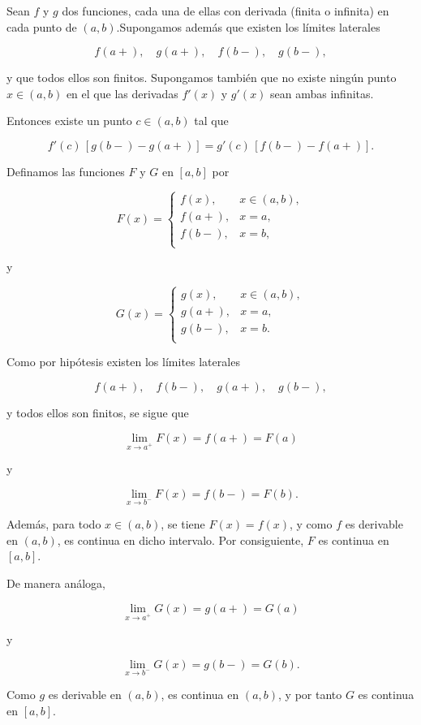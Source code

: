 \begin{teorema}
    Sean $f$ y $g$ dos funciones, cada una de ellas con derivada (finita o infinita) en cada punto de $(a,b)$.Supongamos además que existen los límites laterales

\[
f(a+), \quad g(a+), \quad f(b-), \quad g(b-),
\]

y que todos ellos son finitos. Supongamos también que no existe ningún punto $x\in(a,b)$ en el que las derivadas $f'(x)$ y $g'(x)$ sean ambas infinitas.

Entonces existe un punto $c\in(a,b)$ tal que

\[
f'(c)\,[g(b-)-g(a+)]
=
g'(c)\,[f(b-)-f(a+)].
\]

\end{teorema}
\begin{prueba}
    Definamos las funciones $F$ y $G$ en $[a,b]$ por

\[
F(x)=
\begin{cases}
f(x), & x\in(a,b),\\
f(a+), & x=a, \\
f(b-), & x=b,\\
\end{cases}
\]

y

\[
G(x)=
\begin{cases}
g(x), & x\in(a,b),\\
g(a+), & x=a,\\
g(b-), & x=b.\\
\end{cases}
\]

Como por hipótesis existen los límites laterales

\[
f(a+), \quad f(b-), \quad g(a+), \quad g(b-),
\]

y todos ellos son finitos, se sigue que

\[
\lim_{x\to a^+}F(x)=f(a+)=F(a)
\]

y

\[
\lim_{x\to b^-}F(x)=f(b-)=F(b).
\]

Además, para todo $x\in(a,b)$, se tiene $F(x)=f(x)$, y como $f$ es derivable en $(a,b)$, es continua en dicho intervalo. Por consiguiente, $F$ es continua en $[a,b]$.

De manera análoga,

\[
\lim_{x\to a^+}G(x)=g(a+)=G(a)
\]

y

\[
\lim_{x\to b^-}G(x)=g(b-)=G(b).
\]

Como $g$ es derivable en $(a,b)$, es continua en $(a,b)$, y por tanto $G$ es continua en $[a,b]$.


\end{prueba}
